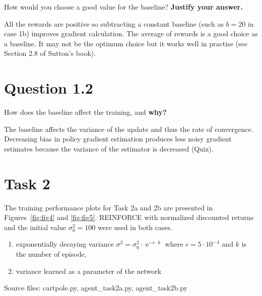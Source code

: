\documentclass[12pt]{article}
\begin{document}
How would you choose a good value for the baseline? \textbf{Justify your
answer.}
\newline

All the rewards are positive so subtracting a constant baseline (such as $b=20$ in case 1b) improves gradient calculation. The average of rewards is a good choice as a baseline. It may not be the optimum choice but it works well in practise (see Section 2.8 of Sutton's book).

\section*{Question 1.2}

How does the baseline affect the training, and \textbf{why?}
\newline

The baseline affects the variance of the update and thus the rate of convergence. Decreasing bias in policy gradient estimation produces less noisy gradient estimates because the variance of the estimator is decreased (Quiz).

\section*{Task 2}

The training performance plots for Task 2a and 2b are presented in Figures~\ref*{fig:fig4} 
and \ref*{fig:fig5}. REINFORCE with normalized discounted returns and the initial value $\sigma_0^2 = 100$ were used  
in both cases.

\begin{enumerate}[label=(\alph*)]
    \item exponentially decaying variance $\sigma^2 = \sigma_0^2 \cdot \operatorname{e}^{-c \cdot k}$ where $c = 5 \cdot 10^{−4}$ and $k$ is the number of episode, 
    \item variance learned as a parameter of the network
\end{enumerate}

\noindent
Source files: cartpole.py, agent\_task2a.py, agent\_task2b.py
\end{document}
